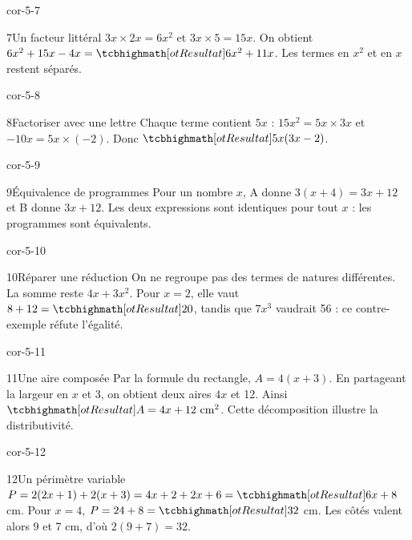 \begin{blocLivre}{cor-5-7}\begin{corrige}{7}{Un facteur littéral}
$3x\times2x=6x^2$ et $3x\times5=15x$. On obtient $6x^2+15x-4x=\res{6x^2+11x}$. Les termes en $x^2$ et en $x$ restent séparés.
\end{corrige}\end{blocLivre}
\begin{blocLivre}{cor-5-8}\begin{corrige}{8}{Factoriser avec une lettre}
Chaque terme contient $5x$ : $15x^2=5x\times3x$ et $-10x=5x\times(-2)$. Donc $\res{5x(3x-2)}$.
\end{corrige}\end{blocLivre}
\begin{blocLivre}{cor-5-9}\begin{corrige}{9}{Équivalence de programmes}
Pour un nombre $x$, A donne $3(x+4)=3x+12$ et B donne $3x+12$. Les deux expressions sont identiques pour tout $x$ : les programmes sont équivalents.
\end{corrige}\end{blocLivre}
\begin{blocLivre}{cor-5-10}\begin{corrige}{10}{Réparer une réduction}
On ne regroupe pas des termes de natures différentes. La somme reste $4x+3x^2$. Pour $x=2$, elle vaut $8+12=\res{20}$, tandis que $7x^3$ vaudrait 56 : ce contre-exemple réfute l’égalité.
\end{corrige}\end{blocLivre}
\begin{blocLivre}{cor-5-11}\begin{corrige}{11}{Une aire composée}
Par la formule du rectangle, $A=4(x+3)$. En partageant la largeur en $x$ et 3, on obtient deux aires $4x$ et 12. Ainsi $\res{A=4x+12\ \mathrm{cm}^2}$. Cette décomposition illustre la distributivité.
\label{fig-cor-5-11}
\end{corrige}\end{blocLivre}
\begin{blocLivre}{cor-5-12}\begin{corrige}{12}{Un périmètre variable}
$P=2(2x+1)+2(x+3)=4x+2+2x+6=\res{6x+8}$ cm. Pour $x=4$, $P=24+8=\res{32}$ cm. Les côtés valent alors 9 et 7 cm, d’où $2(9+7)=32$.
\label{fig-cor-5-12}
\end{corrige}\end{blocLivre}
